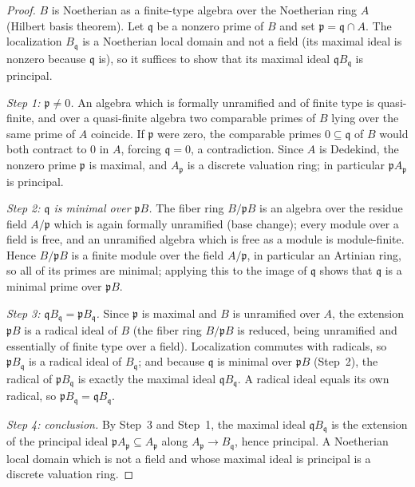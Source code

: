 \begin{proof}
  \leanok
  \(B\) is Noetherian as a finite-type algebra over the Noetherian ring \(A\) (Hilbert basis
  theorem). Let \(\mathfrak q\) be a nonzero prime of \(B\) and set
  \(\mathfrak p = \mathfrak q \cap A\). The localization \(B_{\mathfrak q}\) is a Noetherian
  local domain and not a field (its maximal ideal is nonzero because \(\mathfrak q\) is), so
  it suffices to show that its maximal ideal \(\mathfrak q B_{\mathfrak q}\) is principal.

  \emph{Step 1: \(\mathfrak p \neq 0\).} An algebra which is formally unramified and of
  finite type is quasi-finite, and over a quasi-finite algebra two comparable primes of
  \(B\) lying over the same prime of \(A\) coincide. If \(\mathfrak p\) were zero, the
  comparable primes \(0 \subseteq \mathfrak q\) of \(B\) would both contract to \(0\) in
  \(A\), forcing \(\mathfrak q = 0\), a contradiction. Since \(A\) is Dedekind, the nonzero
  prime \(\mathfrak p\) is maximal, and \(A_{\mathfrak p}\) is a discrete valuation ring; in
  particular \(\mathfrak p A_{\mathfrak p}\) is principal.

  \emph{Step 2: \(\mathfrak q\) is minimal over \(\mathfrak p B\).} The fiber ring
  \(B/\mathfrak p B\) is an algebra over the residue field \(A/\mathfrak p\) which is again
  formally unramified (base change); every module over a field is free, and an unramified
  algebra which is free as a module is module-finite. Hence \(B/\mathfrak p B\) is a finite
  module over the field \(A/\mathfrak p\), in particular an Artinian ring, so all of its
  primes are minimal; applying this to the image of \(\mathfrak q\) shows that
  \(\mathfrak q\) is a minimal prime over \(\mathfrak p B\).

  \emph{Step 3: \(\mathfrak q B_{\mathfrak q} = \mathfrak p B_{\mathfrak q}\).} Since
  \(\mathfrak p\) is maximal and \(B\) is unramified over \(A\), the extension
  \(\mathfrak p B\) is a radical ideal of \(B\) (the fiber ring \(B/\mathfrak p B\) is
  reduced, being unramified and essentially of finite type over a field). Localization
  commutes with radicals, so \(\mathfrak p B_{\mathfrak q}\) is a radical ideal of
  \(B_{\mathfrak q}\); and because \(\mathfrak q\) is minimal over \(\mathfrak p B\)
  (Step~2), the radical of \(\mathfrak p B_{\mathfrak q}\) is exactly the maximal ideal
  \(\mathfrak q B_{\mathfrak q}\). A radical ideal equals its own radical, so
  \(\mathfrak p B_{\mathfrak q} = \mathfrak q B_{\mathfrak q}\).

  \emph{Step 4: conclusion.} By Step~3 and Step~1, the maximal ideal
  \(\mathfrak q B_{\mathfrak q}\) is the extension of the principal ideal
  \(\mathfrak p A_{\mathfrak p} \subseteq A_{\mathfrak p}\) along
  \(A_{\mathfrak p} \to B_{\mathfrak q}\), hence principal. A Noetherian local domain which
  is not a field and whose maximal ideal is principal is a discrete valuation ring.
\end{proof}

